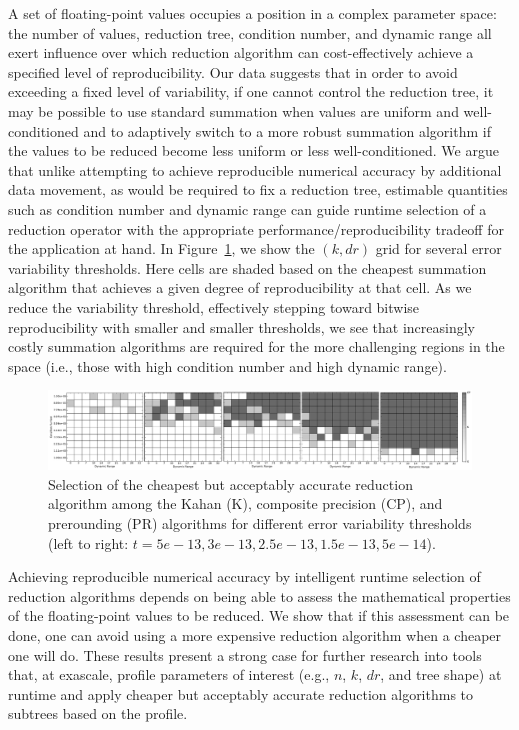 A set of floating-point values occupies a position in a complex
parameter space: the number of values, reduction tree, condition
number, and dynamic range all exert influence over which reduction
algorithm can cost-effectively achieve a specified level of
reproducibility. Our data suggests that in order to avoid exceeding a
fixed level of variability, if one cannot control the reduction tree,
it may be possible to use standard summation when values are uniform
and well-conditioned and to adaptively switch to a more robust
summation algorithm if the values to be reduced become less uniform or
less well-conditioned. We argue that unlike attempting to achieve
reproducible numerical accuracy by additional data movement, as would
be required to fix a reduction tree, estimable quantities such as
condition number and dynamic range can guide runtime selection of a
reduction operator with the appropriate performance/reproducibility
tradeoff for the application at hand. In Figure~\ref{fig:spec}, we
show the $(k, dr)$ grid for several error variability thresholds. Here
cells are shaded based on the cheapest summation algorithm that
achieves a given degree of reproducibility at that cell. As we reduce
the variability threshold, effectively stepping toward bitwise
reproducibility with smaller and smaller thresholds, we see that
increasingly costly summation algorithms are required for the more
challenging regions in the space (i.e., those with high condition
number and high dynamic range).
\begin{figure}[!htb]
  \centering
  \minipage[t]{\textwidth}
  \includegraphics[width=\textwidth]{chapter_2_figures/spectrum.pdf}
  \caption{Selection of the cheapest but acceptably accurate reduction
    algorithm among the Kahan (K), composite precision (CP), and
    prerounding (PR) algorithms for different error variability
    thresholds (left to right: $t=5e-13, 3e-13, 2.5e-13, 1.5e-13,
    5e-14$).}
  \label{fig:spec}
  \endminipage
\end{figure}

Achieving reproducible numerical accuracy by intelligent runtime
selection of reduction algorithms depends on being able to assess the
mathematical properties of the floating-point values to be reduced. We
show that if this assessment can be done, one can avoid using a more
expensive reduction algorithm when a cheaper one will do. These
results present a strong case for further research into tools that, at
exascale, profile parameters of interest (e.g., $n$, $k$, $dr$, and
tree shape) at runtime and apply cheaper but acceptably accurate
reduction algorithms to subtrees based on the profile.

